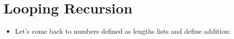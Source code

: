 \documentclass{beamer}
\begin{document}
\section{Looping Recursion}

\begin{itemize}
  \item Let's come back to numbers defined as lengths lists and define
  addition:
\end{itemize}
{}{}{\hlopt{=}}{\hlendline{}}\\
{\hlstd{ \ }}{}{\hlopt{(}}{}{}{\hlopt{->}}{\hlendline{}}\\
{}{\hlopt{(}}{}{\hlopt{)}}\\
{}{\hlopt{(}}{}{\hlopt{(}}{}{\hlopt{(}}{}{\hlopt{) }}{}{\hlopt{))}}{\hlendline{}}\\
{\hlstd{ \ }}{\hlopt{) }}{}{\hlopt{;;}}{\hlendline{}}\\
{}{\hlopt{(}}{}{\hlopt{);;}}
\end{document}
